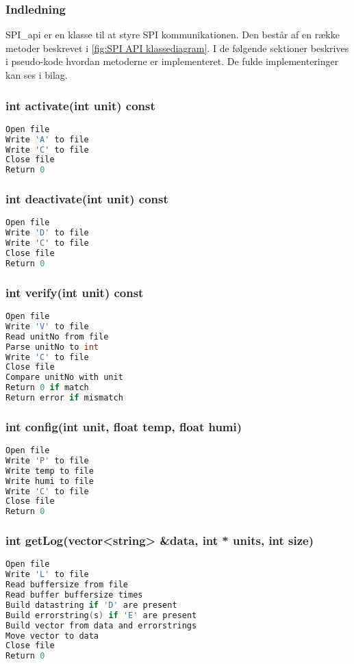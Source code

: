 

\subsubsection{Indledning}

SPI\_api er en klasse til at styre SPI kommunikationen. Den består af en række metoder beskrevet i \ref{fig:SPI API klassediagram}. I de følgende sektioner beskrives i pseudo-kode hvordan metoderne er implementeret. De fulde implementeringer kan ses i bilag.

\subsubsection*{int activate(int unit) const}
\begin{lstlisting}[language=C]
Open file
Write 'A' to file
Write 'C' to file
Close file
Return 0
\end{lstlisting} 
\subsubsection*{int deactivate(int unit) const}
\begin{lstlisting}[language=C]
Open file
Write 'D' to file
Write 'C' to file
Close file
Return 0
\end{lstlisting} 
\subsubsection*{int verify(int unit) const} 
\begin{lstlisting}[language=C]
Open file
Write 'V' to file
Read unitNo from file
Parse unitNo to int
Write 'C' to file
Close file
Compare unitNo with unit
Return 0 if match
Return error if mismatch
\end{lstlisting} 
\subsubsection*{int config(int unit, float temp, float humi)} 
\begin{lstlisting}[language=C]
Open file
Write 'P' to file
Write temp to file
Write humi to file
Write 'C' to file
Close file
Return 0
\end{lstlisting} 
\subsubsection*{int getLog(vector<string> \&data, int * units, int size)}
\begin{lstlisting}[language=C]
Open file
Write 'L' to file
Read buffersize from file
Read buffer buffersize times
Build datastring if 'D' are present
Build errorstring(s) if 'E' are present
Build vector from data and errorstrings
Move vector to data
Close file
Return 0
\end{lstlisting} 
